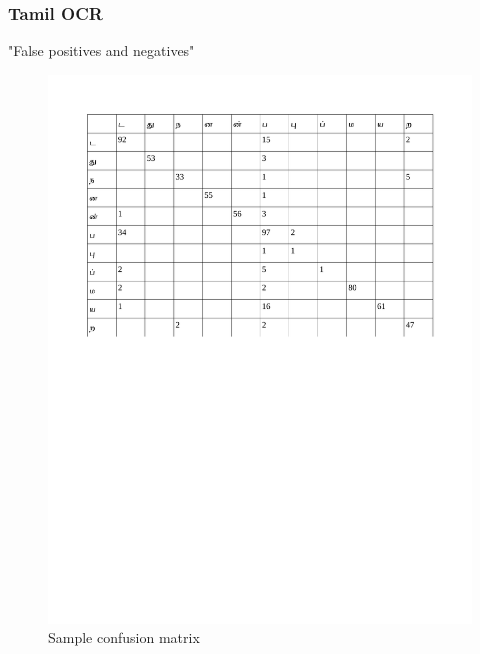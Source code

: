 \documentclass{beamer}
\begin{document}
\begin{frame}
  \frametitle{Tamil OCR}
  "False positives and negatives"
  
\begin{figure}\centering
\includegraphics[scale=0.4]{./img/confuse}
  \caption{Sample confusion matrix}\label{CONF}
\end{figure}


	
	
\end{frame}
\end{document}
